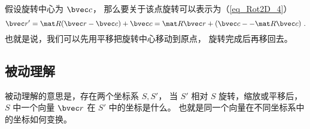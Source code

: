 假设旋转中心为 $\bvec c$， 那么要关于该点旋转可以表示为（\autoref{eq_Rot2D_4}）
\begin{equation}
\bvec r' = \mat R(\bvec r-\bvec c) + \bvec c = \mat R\bvec r + (\bvec c--\mat R\bvec c)~.
\end{equation}
也就是说，我们可以先用平移把旋转中心移动到原点， 旋转完成后再移回去。

\subsection{被动理解}
被动理解的意思是，存在两个坐标系 $S,S'$， 当 $S'$ 相对 $S$ 旋转，缩放或平移后， $S$ 中一个向量 $\bvec r$ 在 $S'$ 中的坐标是什么。 也就是同一个向量在不同坐标系中的坐标如何变换。

